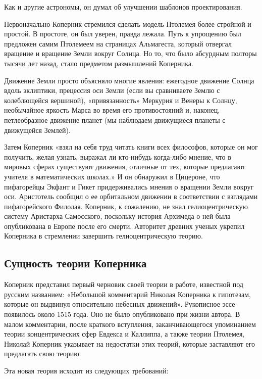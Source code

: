 \documentclass[a4paper, 14pt]{extreport}
\begin{document}
Как и другие астрономы, он думал об улучшении шаблонов проектирования.

Первоначально Коперник стремился сделать модель Птолемея более стройной
и простой. В простоте, он был уверен, правда лежала. Путь к упрощению
был предложен самим Птолемеем на страницах Альмагеста, который отвергал
вращение и вращение Земли вокруг Солнца. Но то, что было абсурдным
полторы тысячи лет назад, стало предметом размышлений Коперника.

Движение Земли просто объясняло многие явления: ежегодное движение
Солнца вдоль эклиптики, прецессия оси Земли (если вы сравниваете Землю с
колеблющейся вершиной), «привязанность» Меркурия и Венеры к Солнцу,
необычайное яркость Марса во время его противостояний и, наконец,
петлеобразное движение планет (мы наблюдаем движущиеся планеты с
движущейся Землей).

Затем Коперник «взял на себя труд читать книги всех философов, которые
он мог получить, желая узнать, выражал ли кто-нибудь когда-либо мнение,
что в мировых сферах существуют движения, отличные от тех, которые
предлагают учителя в математических школах.» И он обнаружил в Цицероне,
что пифагорейцы Экфант и Гикет придерживались мнения о вращении Земли
вокруг оси. Аристотель сообщил о ее орбитальном движении в соответствии
с взглядами пифагорейского Филолая. Коперник, к сожалению, не знал
гелиоцентрическую систему Аристарха Самосского, поскольку история
Архимеда о ней была опубликована в Европе после его смерти. Авторитет
древних ученых укрепил Коперника в стремлении завершить
гелиоцентрическую теорию.

\subsection{Сущность теории Коперника}

Коперник представил первый черновик своей теории в работе, известной под
русским названием: «Небольшой комментарий Николая Коперника к гипотезам,
которые он выдвинул относительно небесных движений». Рукописное эссе
появилось около 1515 года. Оно не было опубликовано при жизни автора. В
малом комментарии, после краткого вступления, заканчивающегося
упоминанием теории концентрических сфер Евдекса и Каллиппа, а также
теории Птолемея, Николай Коперник указывает на недостатки этих теорий,
которые заставляют его предлагать свою теорию.

Эта новая теория исходит из следующих требований:
\end{document}
